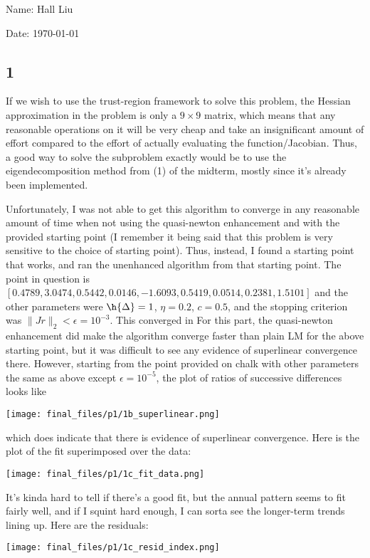 \documentclass{article}
\newcommand{\ep}{\epsilon}
\begin{document}
Name: Hall Liu

Date: \today 
\vspace{1.5cm}
\subsection*{1}
If we wish to use the trust-region framework to solve this problem, the Hessian approximation in the problem is only a $9\times9$ matrix, which means that any reasonable operations on it will be very cheap and take an insignificant amount of effort compared to the effort of actually evaluating the function/Jacobian. Thus, a good way to solve the subproblem exactly would be to use the eigendecomposition method from (1) of the midterm, mostly since it's already been implemented. 

Unfortunately, I was not able to get this algorithm to converge in any reasonable amount of time when not using the quasi-newton enhancement and with the provided starting point (I remember it being said that this problem is very sensitive to the choice of starting point). Thus, instead, I found a starting point that works, and ran the unenhanced algorithm from that starting point. The point in question is 
$[0.4789,3.0474,0.5442,0.0146,-1.6093,0.5419,0.0514,0.2381,1.5101]$
and the other parameters were $\h{\Delta}=1$, $\eta=0.2$, $c=0.5$, and the stopping criterion was $\|Jr\|_2<\ep=10^{-3}$. This converged in 
For this part, the quasi-newton enhancement did make the algorithm converge faster than plain LM for the above starting point, but it was difficult to see any evidence of superlinear convergence there. However, starting from the point provided on chalk with other parameters the same as above except $\ep=10^{-5}$, the plot of ratios of successive differences looks like

\texttt{[image: final\_files/p1/1b\_superlinear.png]}

which does indicate that there is evidence of superlinear convergence.
Here is the plot of the fit superimposed over the data:

\texttt{[image: final\_files/p1/1c\_fit\_data.png]}

It's kinda hard to tell if there's a good fit, but the annual pattern seems to fit fairly well, and if I squint hard enough, I can sorta see the longer-term trends lining up. Here are the residuals:

\texttt{[image: final\_files/p1/1c\_resid\_index.png]}
\end{document}
